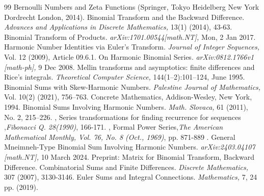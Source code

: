 \documentclass[a4paper,10pt,oneside]{article}
\theoremstyle{definition}
\theoremstyle{remark}
\begin{document}
\begin{thebibliography}{99}
 Bernoulli Numbers and Zeta Functions (Springer, Tokyo Heidelberg New York Dordrecht London, 2014).
 Binomial Transform and the Backward Difference. \emph{Advances and Applications in Discrete Mathematics,} 13(1) (2014), 43-63.
 Binomial Transform of Products. \emph{arXiv:1701.00544[math.NT],} Mon, 2 Jan 2017.
 Harmonic Number Identities via Euler's Transform. \emph{Journal of Integer Sequences,} Vol. 12 (2009), Article 09.6.1.
 On Harmonic Binomial Series. \emph{arXiv:0812.1766v1 [math-ph],} 9 Dec 2008.
 Mellin transforms and asymptotics: finite differences and Rice’s integrals. \emph{Theoretical Computer Science,} 144(1–2):101–124, June 1995.
 Binomial Sums with Skew-Harmonic Numbers. \emph{Palestine Journal of Mathematics,} Vol. 10(2) (2021), 756–763.
 Concrete Mathematics, Addison-Wesley, New York, 1994.
 Binomial Sums Involving Harmonic Numbers. \emph{Math. Slovaca,} 61 (2011), No. 2, 215–226.
, Series transformations for finding recurrence for sequences ,\emph{Fibonacci Q. 28(1990)}, 166-171.
, Formal Power Series,\emph{The American Mathematical Monthly, Vol. 76, No. 8 (Oct., 1969)}, pp. 871-889 .
 General Mneimneh-Type Binomial Sum Involving Harmonic Numbers. \emph{arXiv:2403.04107 [math.NT],} 10 March 2024.
 Preprint: Matrix for Binomial Transform, Backward Difference.
 Combinatorial Sums and Finite Differences. \emph{Discrete Mathematics,} 307 (2007), 3130-3146.
 Euler Sums and Integral Connections. \emph{Mathematics,} 7, 24 pp. (2019).
\end{thebibliography}
\end{document}
